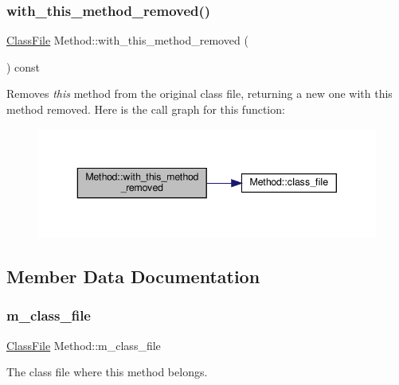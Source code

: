 \subsubsection{\texorpdfstring{with\+\_\+this\+\_\+method\+\_\+removed()}{with\_this\_method\_removed()}}
{\footnotesize\ttfamily \hyperlink{classfile_8h_a00b46b60bc40e813e9fb1bb049174346}{Class\+File} Method\+::with\+\_\+this\+\_\+method\+\_\+removed (\begin{DoxyParamCaption}{ }\end{DoxyParamCaption}) const}

Removes {\itshape this} method from the original class file, returning a new one with this method removed. Here is the call graph for this function\+:\nopagebreak
\begin{figure}[H]
\begin{center}
\leavevmode
\includegraphics[width=343pt]{classMethod_a52e769352ce657232db3a1b936e930b1_cgraph}
\end{center}
\end{figure}


\subsection{Member Data Documentation}
\mbox{\label{classMethod_a6dddd514810b6e9230d554ceb5507a4c}} 
\subsubsection{\texorpdfstring{m\+\_\+class\+\_\+file}{m\_class\_file}}
{\footnotesize\ttfamily \hyperlink{classfile_8h_a00b46b60bc40e813e9fb1bb049174346}{Class\+File} Method\+::m\+\_\+class\+\_\+file\hspace{0.3cm}{\ttfamily [private]}}



The class file where this method belongs. 

\mbox{\label{classMethod_a6d573fa18b21d15b361111bf03f48a74}} 
